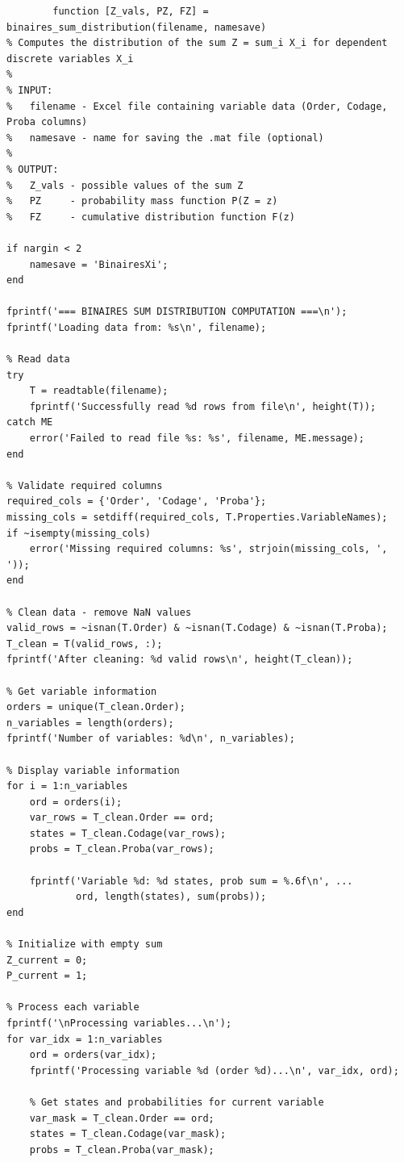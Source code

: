 \begin{matlab}
    \begin{lstlisting}
        function [Z_vals, PZ, FZ] = binaires_sum_distribution(filename, namesave)
% Computes the distribution of the sum Z = sum_i X_i for dependent discrete variables X_i
%
% INPUT:
%   filename - Excel file containing variable data (Order, Codage, Proba columns)
%   namesave - name for saving the .mat file (optional)
%
% OUTPUT:
%   Z_vals - possible values of the sum Z
%   PZ     - probability mass function P(Z = z)
%   FZ     - cumulative distribution function F(z)

if nargin < 2
    namesave = 'BinairesXi';
end

fprintf('=== BINAIRES SUM DISTRIBUTION COMPUTATION ===\n');
fprintf('Loading data from: %s\n', filename);

% Read data
try
    T = readtable(filename);
    fprintf('Successfully read %d rows from file\n', height(T));
catch ME
    error('Failed to read file %s: %s', filename, ME.message);
end

% Validate required columns
required_cols = {'Order', 'Codage', 'Proba'};
missing_cols = setdiff(required_cols, T.Properties.VariableNames);
if ~isempty(missing_cols)
    error('Missing required columns: %s', strjoin(missing_cols, ', '));
end

% Clean data - remove NaN values
valid_rows = ~isnan(T.Order) & ~isnan(T.Codage) & ~isnan(T.Proba);
T_clean = T(valid_rows, :);
fprintf('After cleaning: %d valid rows\n', height(T_clean));

% Get variable information
orders = unique(T_clean.Order);
n_variables = length(orders);
fprintf('Number of variables: %d\n', n_variables);

% Display variable information
for i = 1:n_variables
    ord = orders(i);
    var_rows = T_clean.Order == ord;
    states = T_clean.Codage(var_rows);
    probs = T_clean.Proba(var_rows);
    
    fprintf('Variable %d: %d states, prob sum = %.6f\n', ...
            ord, length(states), sum(probs));
end

% Initialize with empty sum
Z_current = 0;
P_current = 1;

% Process each variable
fprintf('\nProcessing variables...\n');
for var_idx = 1:n_variables
    ord = orders(var_idx);
    fprintf('Processing variable %d (order %d)...\n', var_idx, ord);
    
    % Get states and probabilities for current variable
    var_mask = T_clean.Order == ord;
    states = T_clean.Codage(var_mask);
    probs = T_clean.Proba(var_mask);
    

\end{lstlisting}
\end{matlab}
